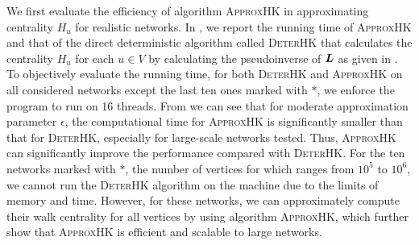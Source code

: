 \documentclass[10pt,twocolumn,twoside]{IEEEtran}
\begin{document}
We first evaluate the efficiency of algorithm \textsc{ApproxHK}  in approximating centrality \(H_u\) for realistic networks.
In , we report the running time of \textsc{ApproxHK} and that of the direct deterministic algorithm called \textsc{DeterHK} that calculates the centrality \(H_u\) for each \(u \in V\) by calculating the pseudoinverse of \(\boldsymbol{L}\) as given  in . To objectively evaluate the running time, for both \textsc{DeterHK} and \textsc{ApproxHK} on all considered networks except the last ten ones marked with \(\ast\), we enforce the program to run on 16 threads. From  we can see that for moderate approximation parameter \(\epsilon\), the computational time for \textsc{ApproxHK} is significantly  smaller than  that  for \textsc{DeterHK}, especially for large-scale networks tested.  Thus, \textsc{ApproxHK} can significantly improve the performance compared with \textsc{DeterHK}. For the  ten networks marked with \(\ast\), the number of vertices for which ranges from \(10^5\) to \(10^6\), we cannot run the \textsc{DeterHK} algorithm on the machine due to the limits of memory and time. However, for these networks, we can approximately compute their walk centrality for all vertices by using algorithm \textsc{ApproxHK}, which further show that \textsc{ApproxHK} is efficient and scalable to large networks.


\end{document}
